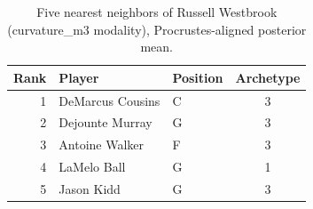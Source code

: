 \begin{table}[htbp]
  \centering\small
  \begin{tabular}{rllc}
    \toprule
    Rank & Player & Position & Archetype \\
    \midrule
    1 & DeMarcus Cousins & C & 3 \\
    2 & Dejounte Murray & G & 3 \\
    3 & Antoine Walker & F & 3 \\
    4 & LaMelo Ball & G & 1 \\
    5 & Jason Kidd & G & 3 \\
    \bottomrule
  \end{tabular}
  \caption{Five nearest neighbors of Russell Westbrook (curvature_m3 modality), Procrustes-aligned posterior mean.}
  \label{tab:Russell_Westbrook_neighbors_curvature_m3}
\end{table}

